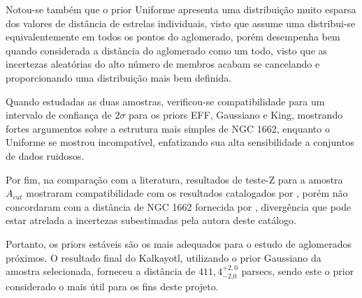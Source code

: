 \documentclass[12pt]{projeto}
\begin{document}
Notou-se também que o prior Uniforme apresenta uma distribuição muito esparsa dos valores de distância de estrelas individuais, visto que assume uma distribui-se equivalentemente em todos os pontos do aglomerado, porém desempenha bem quando considerada a distância do aglomerado como um todo, visto que as incertezas aleatórias do alto número de membros acabam se cancelando e proporcionando uma distribuição mais bem definida.

Quando estudadas as duas amostras, verificou-se compatibilidade para um intervalo de confiança de \(2\sigma\) para os priors EFF, Gaussiano e King, mostrando fortes argumentos sobre a estrutura mais simples de NGC 1662, enquanto o Uniforme se mostrou incompatível, enfatizando sua alta sensibilidade a conjuntos de dados ruidosos.

Por fim, na comparação com a literatura, resultados de teste-Z para a amostra \(A_{cut}\) mostraram compatibilidade com os resultados catalogados por \cite{dias_updated_2021}, porém não concordaram com a distância de NGC 1662 fornecida por \cite{hunt_improving_2024}, divergência que pode estar atrelada a incertezas subestimadas pela autora deste catálogo.


Portanto, os priors estáveis são os mais adequados para o estudo de aglomerados próximos. O resultado final do Kalkayotl, utilizando o prior Gaussiano da amostra selecionada, forneceu a distância de  $411,4^{+2,0}_{-\text{2,0}}$ parsecs, sendo este o prior considerado o mais útil para os fins deste projeto.



\end{document}
